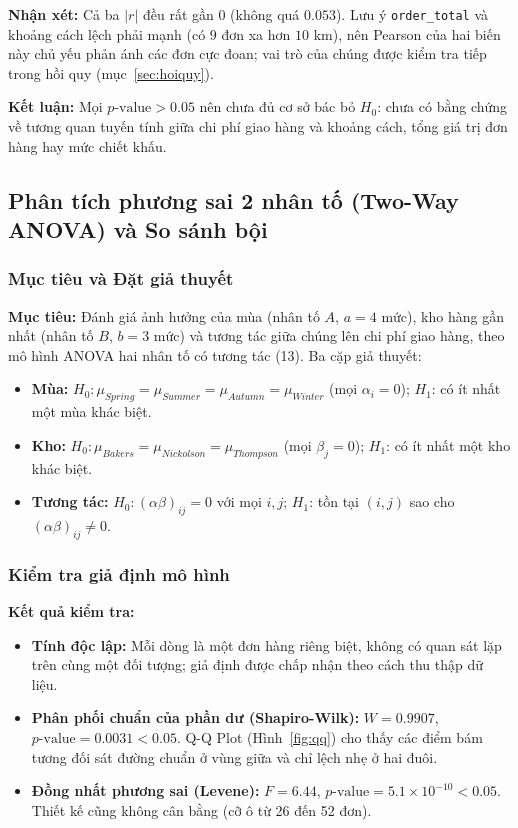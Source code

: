 \textbf{Nhận xét:} Cả ba $|r|$ đều rất gần $0$ (không quá $0.053$). Lưu ý \texttt{order\_total} và khoảng cách lệch phải mạnh (có $9$ đơn xa hơn $10$ km), nên Pearson của hai biến này chủ yếu phản ánh các đơn cực đoan; vai trò của chúng được kiểm tra tiếp trong hồi quy (mục~\ref{sec:hoiquy}).

\textbf{Kết luận:} Mọi $p\text{-value} > 0.05$ nên chưa đủ cơ sở bác bỏ $H_0$: chưa có bằng chứng về tương quan tuyến tính giữa chi phí giao hàng và khoảng cách, tổng giá trị đơn hàng hay mức chiết khấu.

\subsection{Phân tích phương sai 2 nhân tố (Two-Way ANOVA) và So sánh bội}\label{sec:anova}

\subsubsection{Mục tiêu và Đặt giả thuyết}
\textbf{Mục tiêu:} Đánh giá ảnh hưởng của mùa (nhân tố $A$, $a = 4$ mức), kho hàng gần nhất (nhân tố $B$, $b = 3$ mức) và tương tác giữa chúng lên chi phí giao hàng, theo mô hình ANOVA hai nhân tố có tương tác (13). Ba cặp giả thuyết:
\begin{itemize}
    \item[-] \textbf{Mùa:} $H_0: \mu_{Spring} = \mu_{Summer} = \mu_{Autumn} = \mu_{Winter}$ (mọi $\alpha_i = 0$); $H_1$: có ít nhất một mùa khác biệt.
    \item[-] \textbf{Kho:} $H_0: \mu_{Bakers} = \mu_{Nickolson} = \mu_{Thompson}$ (mọi $\beta_j = 0$); $H_1$: có ít nhất một kho khác biệt.
    \item[-] \textbf{Tương tác:} $H_0: (\alpha\beta)_{ij} = 0$ với mọi $i, j$; $H_1$: tồn tại $(i, j)$ sao cho $(\alpha\beta)_{ij} \ne 0$.
\end{itemize}

\subsubsection{Kiểm tra giả định mô hình}
\textbf{Kết quả kiểm tra:}
\begin{itemize}
    \item[-] \textbf{Tính độc lập:} Mỗi dòng là một đơn hàng riêng biệt, không có quan sát lặp trên cùng một đối tượng; giả định được chấp nhận theo cách thu thập dữ liệu.
    \item[-] \textbf{Phân phối chuẩn của phần dư (Shapiro-Wilk):} $W = 0.9907$, $p\text{-value} = 0.0031 < 0.05$. Q-Q Plot (Hình~\ref{fig:qq}) cho thấy các điểm bám tương đối sát đường chuẩn ở vùng giữa và chỉ lệch nhẹ ở hai đuôi.
    \item[-] \textbf{Đồng nhất phương sai (Levene):} $F = 6.44$, $p\text{-value} = 5.1 \times 10^{-10} < 0.05$. Thiết kế cũng không cân bằng (cỡ ô từ 26 đến 52 đơn).
\end{itemize}

